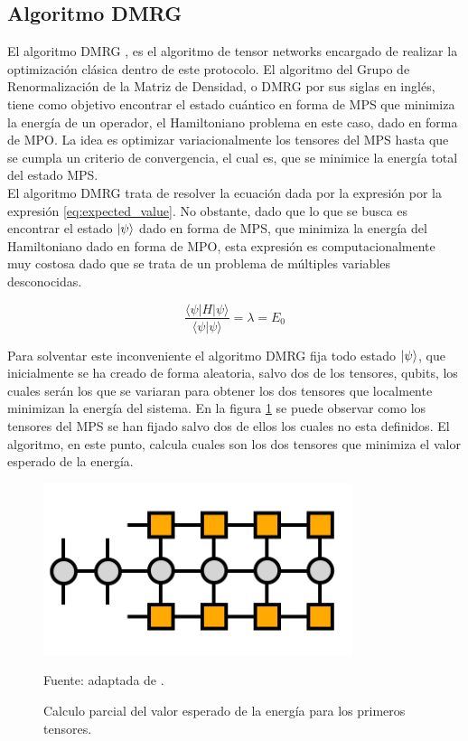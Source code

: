 \subsection{Algoritmo DMRG}
\label{sub_sec:dmrg}

El algoritmo DMRG \citep{schollwöck}, es el algoritmo de tensor  networks encargado de realizar la optimización clásica dentro de este protocolo. El algoritmo del Grupo de Renormalización de la Matriz de Densidad, o DMRG por sus siglas en inglés, tiene como objetivo encontrar el estado cuántico en forma de MPS que minimiza la energía de un operador, el Hamiltoniano problema en este caso, dado en forma de MPO. La idea es optimizar variacionalmente los tensores del MPS hasta que se cumpla un criterio de convergencia, el cual es, que se minimice la energía total del estado MPS. \\

El algoritmo DMRG trata de resolver la ecuación dada por la expresión por la expresión \ref{eq:expected_value}. No obstante, dado que lo que se busca es encontrar el estado $\ket{\psi}$ dado en forma de MPS, que minimiza la energía del Hamiltoniano dado en forma de MPO, esta expresión es computacionalmente muy costosa dado que se trata de un problema de múltiples variables desconocidas. 


\begin{equation}
    \frac{\langle \psi | H | \psi \rangle}{\langle \psi | \psi \rangle} = \lambda = E_0
    \label{eq:expected_value}
\end{equation}

Para solventar este inconveniente el algoritmo DMRG fija todo estado $\ket{\psi}$, que inicialmente se ha creado de forma aleatoria, salvo dos de los tensores, qubits, los cuales serán los que se variaran para obtener los dos tensores que localmente minimizan la energía del sistema. En la figura \ref{fig:mpo_mps} se puede observar como los tensores del MPS se han fijado salvo dos de ellos los cuales no esta definidos. El algoritmo, en este punto, calcula cuales son los dos tensores que minimiza el valor esperado de la energía.

\begin{figure}[!h]
    \centering
    \includegraphics[scale = 0.7]{img/05-dmrg_mpo_mps.png}
    \caption{Calculo parcial del valor esperado de la energía para los primeros tensores.}
    Fuente: adaptada de \citep{tn}.
    \label{fig:mpo_mps}
\end{figure}


